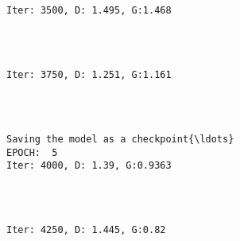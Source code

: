 \documentclass[11pt]{article}
\begin{document}
    \begin{center}
    \end{center}
    { \hspace*{\fill} \\}
    
    \begin{Verbatim}[commandchars=\\\{\}]

Iter: 3500, D: 1.495, G:1.468
    \end{Verbatim}

    \begin{center}
    \end{center}
    { \hspace*{\fill} \\}
    
    \begin{Verbatim}[commandchars=\\\{\}]

Iter: 3750, D: 1.251, G:1.161
    \end{Verbatim}

    \begin{center}
    \end{center}
    { \hspace*{\fill} \\}
    
    \begin{Verbatim}[commandchars=\\\{\}]

Saving the model as a checkpoint{\ldots}
EPOCH:  5
Iter: 4000, D: 1.39, G:0.9363
    \end{Verbatim}

    \begin{center}
    \end{center}
    { \hspace*{\fill} \\}
    
    \begin{Verbatim}[commandchars=\\\{\}]

Iter: 4250, D: 1.445, G:0.82
    \end{Verbatim}
\end{document}
